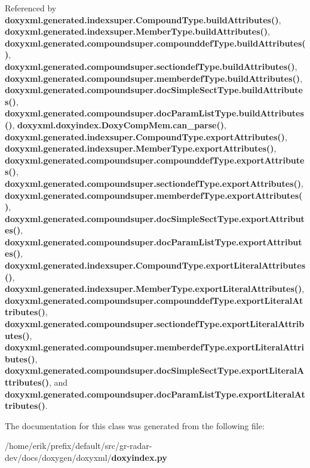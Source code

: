 Referenced by {\bf doxyxml.\+generated.\+indexsuper.\+Compound\+Type.\+build\+Attributes()}, {\bf doxyxml.\+generated.\+indexsuper.\+Member\+Type.\+build\+Attributes()}, {\bf doxyxml.\+generated.\+compoundsuper.\+compounddef\+Type.\+build\+Attributes()}, {\bf doxyxml.\+generated.\+compoundsuper.\+sectiondef\+Type.\+build\+Attributes()}, {\bf doxyxml.\+generated.\+compoundsuper.\+memberdef\+Type.\+build\+Attributes()}, {\bf doxyxml.\+generated.\+compoundsuper.\+doc\+Simple\+Sect\+Type.\+build\+Attributes()}, {\bf doxyxml.\+generated.\+compoundsuper.\+doc\+Param\+List\+Type.\+build\+Attributes()}, {\bf doxyxml.\+doxyindex.\+Doxy\+Comp\+Mem.\+can\+\_\+parse()}, {\bf doxyxml.\+generated.\+indexsuper.\+Compound\+Type.\+export\+Attributes()}, {\bf doxyxml.\+generated.\+indexsuper.\+Member\+Type.\+export\+Attributes()}, {\bf doxyxml.\+generated.\+compoundsuper.\+compounddef\+Type.\+export\+Attributes()}, {\bf doxyxml.\+generated.\+compoundsuper.\+sectiondef\+Type.\+export\+Attributes()}, {\bf doxyxml.\+generated.\+compoundsuper.\+memberdef\+Type.\+export\+Attributes()}, {\bf doxyxml.\+generated.\+compoundsuper.\+doc\+Simple\+Sect\+Type.\+export\+Attributes()}, {\bf doxyxml.\+generated.\+compoundsuper.\+doc\+Param\+List\+Type.\+export\+Attributes()}, {\bf doxyxml.\+generated.\+indexsuper.\+Compound\+Type.\+export\+Literal\+Attributes()}, {\bf doxyxml.\+generated.\+indexsuper.\+Member\+Type.\+export\+Literal\+Attributes()}, {\bf doxyxml.\+generated.\+compoundsuper.\+compounddef\+Type.\+export\+Literal\+Attributes()}, {\bf doxyxml.\+generated.\+compoundsuper.\+sectiondef\+Type.\+export\+Literal\+Attributes()}, {\bf doxyxml.\+generated.\+compoundsuper.\+memberdef\+Type.\+export\+Literal\+Attributes()}, {\bf doxyxml.\+generated.\+compoundsuper.\+doc\+Simple\+Sect\+Type.\+export\+Literal\+Attributes()}, and {\bf doxyxml.\+generated.\+compoundsuper.\+doc\+Param\+List\+Type.\+export\+Literal\+Attributes()}.



The documentation for this class was generated from the following file\+:\begin{DoxyCompactItemize}
\item 
/home/erik/prefix/default/src/gr-\/radar-\/dev/docs/doxygen/doxyxml/{\bf doxyindex.\+py}\end{DoxyCompactItemize}
